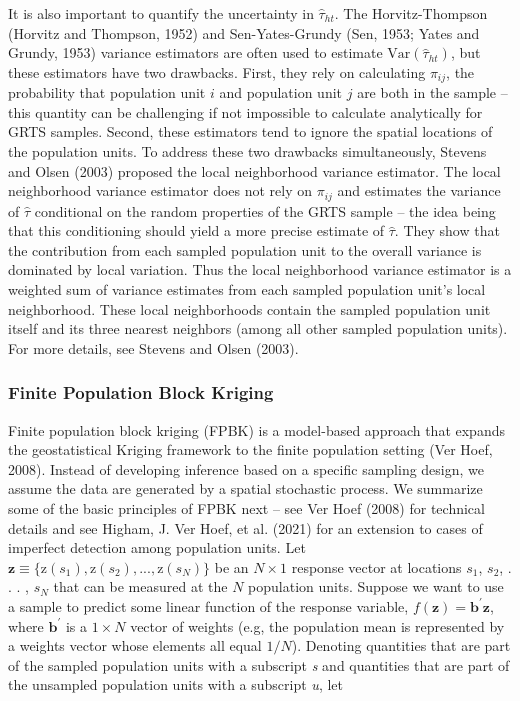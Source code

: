 \documentclass[]{elsarticle} %
\begin{document}
It is also important to quantify the uncertainty in \(\hat{\tau}_{ht}\).
The Horvitz-Thompson (Horvitz and Thompson, 1952) and Sen-Yates-Grundy
(Sen, 1953; Yates and Grundy, 1953) variance estimators are often used
to estimate \(\text{Var}(\hat{\tau}_{ht})\), but these estimators have
two drawbacks. First, they rely on calculating \(\pi_{ij}\), the
probability that population unit \(i\) and population unit \(j\) are
both in the sample -- this quantity can be challenging if not impossible
to calculate analytically for GRTS samples. Second, these estimators
tend to ignore the spatial locations of the population units. To address
these two drawbacks simultaneously, Stevens and Olsen (2003) proposed
the local neighborhood variance estimator. The local neighborhood
variance estimator does not rely on \(\pi_{ij}\) and estimates the
variance of \(\hat{\tau}\) conditional on the random properties of the
GRTS sample -- the idea being that this conditioning should yield a more
precise estimate of \(\hat{\tau}\). They show that the contribution from
each sampled population unit to the overall variance is dominated by
local variation. Thus the local neighborhood variance estimator is a
weighted sum of variance estimates from each sampled population unit's
local neighborhood. These local neighborhoods contain the sampled
population unit itself and its three nearest neighbors (among all other
sampled population units). For more details, see Stevens and Olsen
(2003).

\hypertarget{finite-population-block-kriging}{%
\subsubsection{Finite Population Block
Kriging}\label{finite-population-block-kriging}}

Finite population block kriging (FPBK) is a model-based approach that
expands the geostatistical Kriging framework to the finite population
setting (Ver Hoef, 2008). Instead of developing inference based on a
specific sampling design, we assume the data are generated by a spatial
stochastic process. We summarize some of the basic principles of FPBK
next -- see Ver Hoef (2008) for technical details and see Higham, J. Ver
Hoef, et al. (2021) for an extension to cases of imperfect detection
among population units. Let
\({\mathbf{z} \equiv \{\text{z}(s_1), \text{z}(s_2), . . . , \text{z}(s_N) \}}\)
be an \(N \times 1\) response vector at locations \(s_1\), \(s_2\), . .
. , \(s_N\) that can be measured at the \(N\) population units. Suppose
we want to use a sample to predict some linear function of the response
variable, \(f(\mathbf{z}) = \mathbf{b}^\prime \mathbf{z}\), where
\(\mathbf{b}^\prime\) is a \(1 \times N\) vector of weights (e.g, the
population mean is represented by a weights vector whose elements all
equal \(1 / N\)). Denoting quantities that are part of the sampled
population units with a subscript \emph{s} and quantities that are part
of the unsampled population units with a subscript \emph{u}, let
\end{document}
